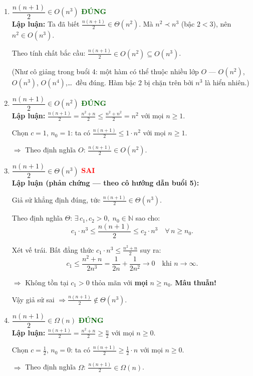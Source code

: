 \documentclass[12pt,a4paper]{article}
\begin{document}
\begin{enumerate}[label=\textbf{\alph*.}]

  \item $\dfrac{n(n+1)}{2} \in O(n^3)$ \hfill \textcolor{darkgreen}{\textbf{ĐÚNG}} \\[4pt]
  \textbf{Lập luận:} Ta đã biết $\frac{n(n+1)}{2} \in \Theta(n^2)$.
  Mà $n^2 \prec n^3$ (bậc $2 < 3$), nên $n^2 \in O(n^3)$.

  Theo tính chất bắc cầu: $\frac{n(n+1)}{2} \in O(n^2) \subseteq O(n^3)$.

  (Như cô giảng trong buổi 4: một hàm có thể thuộc nhiều lớp $O$ --- $O(n^2)$, $O(n^3)$, $O(n^4)$,\ldots\ đều đúng.
  Hàm bậc 2 bị chặn trên bởi $n^3$ là hiển nhiên.)

  \bigskip

  \item $\dfrac{n(n+1)}{2} \in O(n^2)$ \hfill \textcolor{darkgreen}{\textbf{ĐÚNG}} \\[4pt]
  \textbf{Lập luận:} $\frac{n(n+1)}{2} = \frac{n^2 + n}{2} \leq \frac{n^2 + n^2}{2} = n^2$ với mọi $n \geq 1$.

  Chọn $c = 1$, $n_0 = 1$: ta có $\frac{n(n+1)}{2} \leq 1 \cdot n^2$ với mọi $n \geq 1$.

  $\Longrightarrow$ Theo định nghĩa $O$: $\frac{n(n+1)}{2} \in O(n^2)$. \checkmark

  \bigskip

  \item $\dfrac{n(n+1)}{2} \in \Theta(n^3)$ \hfill \textcolor{red}{\textbf{SAI}} \\[4pt]
  \textbf{Lập luận (phản chứng --- theo cô hướng dẫn buổi 5):}

  Giả sử khẳng định đúng, tức $\frac{n(n+1)}{2} \in \Theta(n^3)$.

  Theo định nghĩa $\Theta$: $\exists\, c_1, c_2 > 0,\; n_0 \in \mathbb{N}$ sao cho:
  \[
    c_1 \cdot n^3 \leq \frac{n(n+1)}{2} \leq c_2 \cdot n^3 \quad \forall\, n \geq n_0.
  \]

  Xét vế trái. Bất đẳng thức $c_1 \cdot n^3 \leq \frac{n^2+n}{2}$ suy ra:
  \[
    c_1 \leq \frac{n^2+n}{2n^3} = \frac{1}{2n} + \frac{1}{2n^2} \to 0 \quad \text{khi } n \to \infty.
  \]

  $\Longrightarrow$ Không tồn tại $c_1 > 0$ thỏa mãn với \textbf{mọi} $n \geq n_0$. \textbf{Mâu thuẫn!}

  Vậy giả sử sai $\Rightarrow \frac{n(n+1)}{2} \notin \Theta(n^3)$.

  \bigskip

  \item $\dfrac{n(n+1)}{2} \in \Omega(n)$ \hfill \textcolor{darkgreen}{\textbf{ĐÚNG}} \\[4pt]
  \textbf{Lập luận:} $\frac{n(n+1)}{2} = \frac{n^2+n}{2} \geq \frac{n}{2}$ với mọi $n \geq 0$.

  Chọn $c = \frac{1}{2}$, $n_0 = 0$: ta có $\frac{n(n+1)}{2} \geq \frac{1}{2} \cdot n$ với mọi $n \geq 0$.

  $\Longrightarrow$ Theo định nghĩa $\Omega$: $\frac{n(n+1)}{2} \in \Omega(n)$. \checkmark

\end{enumerate}
\end{document}
